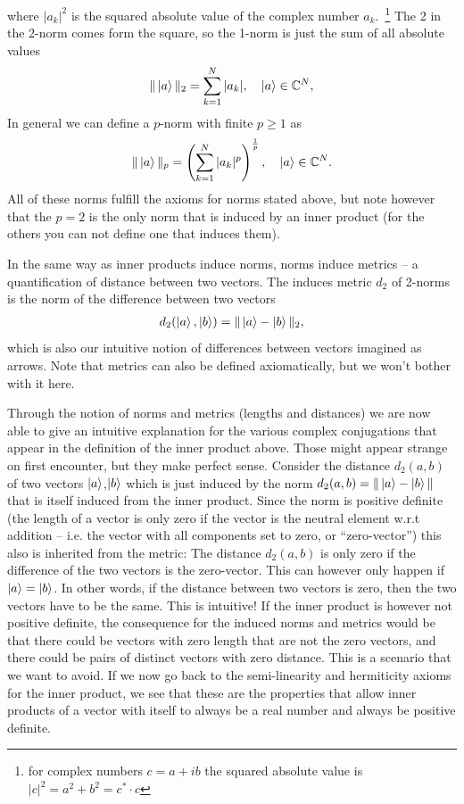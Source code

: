 where $|a_k|^2$ is the squared absolute value of the complex number $a_k$.~\footnote{for complex numbers $c=a + ib$ the squared absolute value is $|c|^2 = a^2 + b^2 = c^* \cdot c$}
The 2 in the 2-norm comes form the square, so the 1-norm is just the sum of all absolute values
\begin{align}
    \| \ket{a} \|_2 = \sum_{k=1}^N |a_k|, \quad \ket{a}\in\mathbb{C}^N,
\end{align}
In general we can define a $p$-norm with finite $p\geq 1 $ as
\begin{align}
    \| \ket{a} \|_p = \left(\sum_{k=1}^N |a_k|^p\right)^{\frac{1}{p}}, \quad \ket{a}\in\mathbb{C}^N.
\end{align}
All of these norms fulfill the axioms for norms stated above, but note however that the $p=2$ is the only norm that is induced by an inner product (for the others you can not define one that induces them).

In the same way as inner products induce norms, norms induce metrics -- a quantification of distance between two vectors. The induces metric $d_2$ of 2-norms is the norm of the difference between two vectors 
\begin{align*}
    d_2(\ket{a}, \ket{b}) = \| \ket{a} - \ket{b} \|_2,
\end{align*}
which is also our intuitive notion of differences between vectors imagined as arrows. Note that metrics can also be defined axiomatically, but we won't bother with it here.

Through the notion of norms and metrics (lengths and distances) we are now able to give an intuitive explanation for the various complex conjugations that appear in the definition of the inner product above. Those might appear strange on first encounter, but they make perfect sense.
Consider the distance $d_2(a,b)$ of two vectors $\ket{a}$,$\ket{b}$ which is just induced by the norm $d_2(a,b) = \|\ket{a}-\ket{b} \|$ that is itself induced from the inner product. 
Since the norm is positive definite (the length of a vector is only zero if the vector is the neutral element w.r.t addition -- i.e. the vector with all components set to zero, or ``zero-vector'') this also is inherited from the metric: The distance $d_2(a,b)$ is only zero if the difference of the two vectors is the zero-vector. This can however only happen if $\ket{a}=\ket{b}$.
In other words, if the distance between two vectors is zero, then the two vectors have to be the same. 
This is intuitive! 
If the inner product is however not positive definite, the consequence for the induced norms and metrics would be that there could be vectors with zero length that are not the zero vectors, and there could be pairs of distinct vectors with zero distance. 
This is a scenario that we want to avoid. 
If we now go back to the semi-linearity and hermiticity axioms for the inner product, we see that these are the properties that allow inner products of a vector with itself to always be a real number and always be positive definite. 

